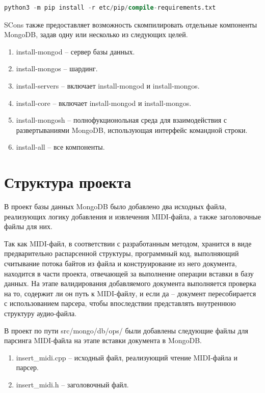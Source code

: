 \begin{lstlisting}[language=sql, label=some-code, caption=Команда для установки необходимых для сборки модулей Python, label=lst:python_modules]
python3 -m pip install -r etc/pip/compile-requirements.txt  
\end{lstlisting}

SCons также предоставляет возможность скомпилировать отдельные компоненты MongoDB, задав одну или несколько из следующих целей.
\begin{enumerate}
\item install-mongod -- сервер базы данных.
\item install-mongos -- шардинг.
\item install-servers -- включает install-mongod и install-mongos.
\item install-core -- включает install-mongod и install-mongos.
\item install-mongosh -- полнофукционольная среда для взаимодействия с развертываниями MongoDB, использующая интерфейс командной строки.
\item install-all -- все компоненты.
\end{enumerate}

\section{Структура проекта}

В проект базы данных MongoDB было добавлено два исходных файла, реализующих логику добавления и извлечения MIDI-файла, а также заголовочные файлы для них. 

Так как MIDI-файл, в соответствии с разработанным методом, хранится в виде предварительно распарсенной структуры, программный код, выполняющий считывание потока байтов из файла и конструирование из него документа, находится в части проекта, отвечающей за выполнение операции вставки в базу данных. На этапе валидирования добавляемого документа выполняется проверка на то, содержит ли он путь к MIDI-файлу, и если да -- документ пересобирается с использованием парсера, чтобы впоследствии представлять внутреннюю структуру аудио-файла.

В проект по пути src/mongo/db/ops/ были добавлены следующие файлы для парсинга MIDI-файла на этапе вставки документа в MongoDB.
\begin{enumerate}
\item insert\_midi.cpp -- исходный файл, реализующий чтение MIDI-файла и парсер.
\item insert\_midi.h -- заголовочный файл.
\end{enumerate}

